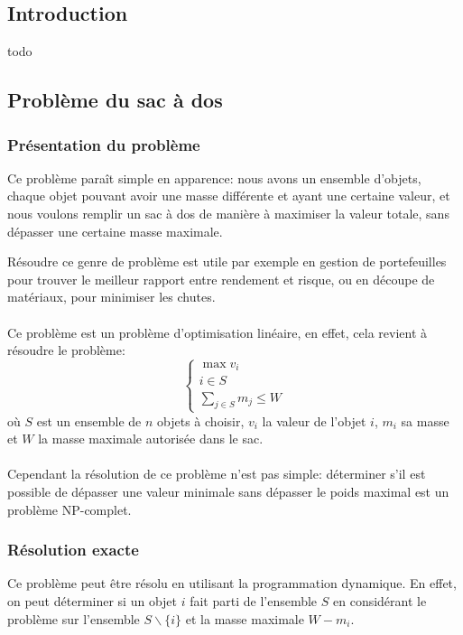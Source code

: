 \subsection{Introduction}
  todo

\subsection{Problème du sac à dos}
  \subsubsection{Présentation du problème}
    Ce problème paraît simple en apparence: nous avons un ensemble d'objets,
    chaque objet pouvant avoir une masse différente et ayant une certaine
    valeur, et nous voulons remplir un sac à dos de manière à maximiser la
    valeur totale, sans dépasser une certaine masse maximale.

    Résoudre ce genre de problème est utile par exemple en gestion de
    portefeuilles pour trouver le meilleur rapport entre rendement et risque,
    ou en découpe de matériaux, pour minimiser les chutes.

    \paragraph{}
    Ce problème est un problème d'optimisation linéaire, en effet, cela revient
    à résoudre le problème:
    \[ \left\{ \begin{array}{l}
        \max v_i \\
        i \in S \\
        \displaystyle\sum_{j \in S} m_j \leq W
      \end{array} \right.
    \]
    où $S$ est un ensemble de $n$ objets à choisir, $v_i$ la valeur de l'objet
    $i$, $m_i$ sa masse et $W$ la masse maximale autorisée dans le sac.

    \paragraph{}
    Cependant la résolution de ce problème n'est pas simple: déterminer s'il
    est possible de dépasser une valeur minimale sans dépasser le poids maximal
    est un problème NP\nobreakdash-complet.

  \subsubsection{Résolution exacte}
    Ce problème peut être résolu en utilisant la programmation dynamique. En
    effet, on peut déterminer si un objet $i$ fait parti de l'ensemble $S$ en
    considérant le problème sur l'ensemble $S\backslash \{i\}$ et la masse
    maximale $W-m_i$.
    
